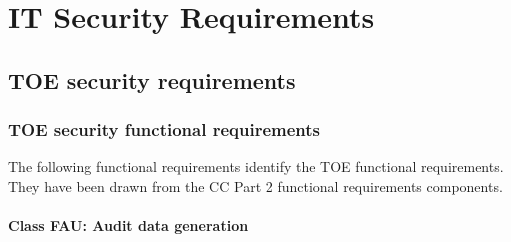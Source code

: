 \documentclass[12pt,english]{scrbook}
\begin{document}



\chapter{IT Security Requirements}





\section{TOE security requirements}





\subsection{TOE security functional requirements}

The following functional requirements identify the TOE functional requirements.
They have been drawn from the CC Part 2 functional requirements components.





\subsubsection{Class FAU: Audit data generation}


\end{document}
